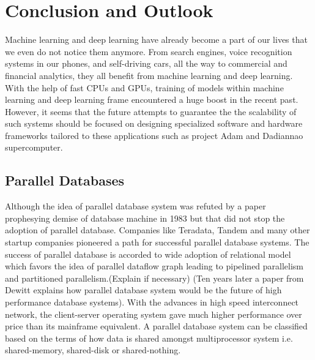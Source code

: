 \documentclass[runningheads,a4paper]{llncs}
\begin{document}
\section*{Conclusion and Outlook}
Machine learning and deep learning  have already become a part of our lives that we even do not notice them anymore. From search engines, voice recognition systems in our phones, and self-driving cars, all the way to commercial and financial analytics, they all benefit from machine learning and deep learning. With the help of fast CPUs and GPUs, training of models within machine learning and deep learning frame encountered a huge boost in the recent past. However, it seems that the future attempts to guarantee the the scalability of such systems should be focused on designing specialized software and hardware frameworks tailored to these applications such as project Adam and Dadiannao supercomputer.\\
\subsection{Parallel Databases}
Although the idea of parallel database system was refuted by a paper prophesying demise of database machine in 1983 but that did not stop the adoption of parallel database. Companies like Teradata, Tandem and many other startup companies pioneered a path for successful parallel database systems. The success of parallel database is accorded to wide adoption of relational model which favors the idea of parallel dataflow graph leading to pipelined parallelism and partitioned parallelism.(Explain if necessary) (Ten years later a paper from Dewitt explains how parallel database system would be the future of high performance database systems). With the advances in high speed interconnect network, the client-server operating system gave much higher performance over price than its mainframe equivalent.
A parallel database system can be classified based on the terms of how data is shared amongst multiprocessor system i.e. shared-memory, shared-disk or shared-nothing.\\
\end{document}
